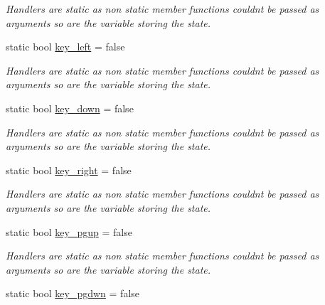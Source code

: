 \begin{DoxyCompactItemize}
\begin{DoxyCompactList}\small\item\em Handlers are static as non static member functions couldn\textquotesingle{}t be passed as arguments so are the variable storing the state. \end{DoxyCompactList}\item 
static bool \hyperlink{classcft_1_1Scene_aec4f6b7d2f1c91f8278448e77b2f3d2b}{key\+\_\+left} = false\hypertarget{classcft_1_1Scene_aec4f6b7d2f1c91f8278448e77b2f3d2b}{}\label{classcft_1_1Scene_aec4f6b7d2f1c91f8278448e77b2f3d2b}

\begin{DoxyCompactList}\small\item\em Handlers are static as non static member functions couldn\textquotesingle{}t be passed as arguments so are the variable storing the state. \end{DoxyCompactList}\item 
static bool \hyperlink{classcft_1_1Scene_ad75fc941a38b667bc3a4d6ba0b29f45d}{key\+\_\+down} = false\hypertarget{classcft_1_1Scene_ad75fc941a38b667bc3a4d6ba0b29f45d}{}\label{classcft_1_1Scene_ad75fc941a38b667bc3a4d6ba0b29f45d}

\begin{DoxyCompactList}\small\item\em Handlers are static as non static member functions couldn\textquotesingle{}t be passed as arguments so are the variable storing the state. \end{DoxyCompactList}\item 
static bool \hyperlink{classcft_1_1Scene_a1d10514cd72380e1291cfb5a8ec05b24}{key\+\_\+right} = false\hypertarget{classcft_1_1Scene_a1d10514cd72380e1291cfb5a8ec05b24}{}\label{classcft_1_1Scene_a1d10514cd72380e1291cfb5a8ec05b24}

\begin{DoxyCompactList}\small\item\em Handlers are static as non static member functions couldn\textquotesingle{}t be passed as arguments so are the variable storing the state. \end{DoxyCompactList}\item 
static bool \hyperlink{classcft_1_1Scene_a8fb47f7100d06af74f36b2b8c23f7a65}{key\+\_\+pgup} = false\hypertarget{classcft_1_1Scene_a8fb47f7100d06af74f36b2b8c23f7a65}{}\label{classcft_1_1Scene_a8fb47f7100d06af74f36b2b8c23f7a65}

\begin{DoxyCompactList}\small\item\em Handlers are static as non static member functions couldn\textquotesingle{}t be passed as arguments so are the variable storing the state. \end{DoxyCompactList}\item 
static bool \hyperlink{classcft_1_1Scene_a003d215e69a801c3ef7a57c88bada0d7}{key\+\_\+pgdwn} = false\hypertarget{classcft_1_1Scene_a003d215e69a801c3ef7a57c88bada0d7}{}\label{classcft_1_1Scene_a003d215e69a801c3ef7a57c88bada0d7}


\end{DoxyCompactItemize}
